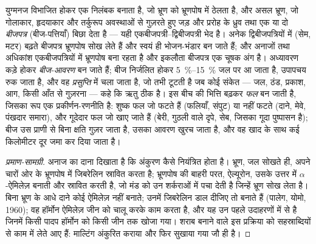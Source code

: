 \begin{definition}[बीजांड से बीज तक, अंडाशय से फल तक]\label{def:b2:angiosperm-reproduction:seed}
युग्मनज विभाजित होकर एक निलंबक बनाता है, जो भ्रूण को भ्रूणपोष में
ठेलता है, और असल भ्रूण, जो गोलाकार, हृदयाकार और तर्कुरूप अवस्थाओं से
गुज़रते हुए जड़ और प्ररोह के ध्रुव तथा एक या दो \emph{बीजपत्र}
(बीज-पत्तियाँ) बिछा देता है --- यही एकबीजपत्री--द्विबीजपत्री भेद है।
अनेक द्विबीजपत्रियों में (सेम, मटर) बढ़ते बीजपत्र भ्रूणपोष सोख लेते हैं
और स्वयं ही भोजन-भंडार बन जाते हैं; और अनाजों तथा अधिकांश
एकबीजपत्रियों में भ्रूणपोष बना रहता है और इकलौता बीजपत्र एक चूषक अंग है।
अध्यावरण कड़े होकर \emph{बीज-आवरण} बन जाते हैं; बीज निर्जलित होकर
\qtyrange{5}{15}{\%} जल पर आ जाता है, उपापचय रुक जाता है, और वह
\emph{प्रसुप्ति} में चला जाता है, जो तभी टूटती है जब कोई संकेत ---
जल, ठंड, प्रकाश, आग, किसी आँत से गुज़रना --- कहे कि ऋतु ठीक है। इस बीच
 की भित्ति बढ़कर \emph{फल} बन जाती है, जिसका रूप एक
प्रकीर्णन-रणनीति है: शुष्क फल जो फटते हैं (फलियाँ, संपुट) या नहीं फटते
(दाने, मेवे, पंखदार समारा), और गूदेदार फल जो खाए जाते हैं (बेरी, गुठली
वाले दृपे, सेब, जिसका गूदा पुष्पासन है); बीज उस प्राणी से बिना क्षति
गुज़र जाता है, उसका आवरण खुरच जाता है, और वह खाद के साथ कई किलोमीटर दूर
जमा कर दिया जाता है।
\end{definition}
\begin{proof}[प्रमाण-सामग्री]
अनाज का दाना दिखाता है कि अंकुरण कैसे नियंत्रित होता है। भ्रूण,
जल सोखते ही, अपने चारों ओर के भ्रूणपोष में जिबरेलिन स्रावित करता है;
भ्रूणपोष की बाहरी परत, ऐल्यूरोन, उसके उत्तर में $\alpha$-ऐमिलेज़ बनाती
और स्रावित करती है, जो मंड को उन शर्कराओं में पचा देती है जिन्हें भ्रूण
सोख लेता है। बिना भ्रूण के आधे दाने कोई ऐमिलेज़ नहीं बनाते; उनमें
जिबरेलिन डाल दीजिए तो बनाते हैं (पालेग, योमो, 1960); वह
हॉर्मोन ऐमिलेज़ जीन को चालू करके काम करता है, और यह उन पहले उदाहरणों में
से है जिनमें किसी पादप हॉर्मोन को किसी जीन तक खोजा गया। शराब बनाने वाले
इस प्रक्रिया को सहस्राब्दियों से काम में लेते आए हैं: माल्टिंग अंकुरित
कराया और फिर सुखाया गया जौ ही है।
\end{proof}

